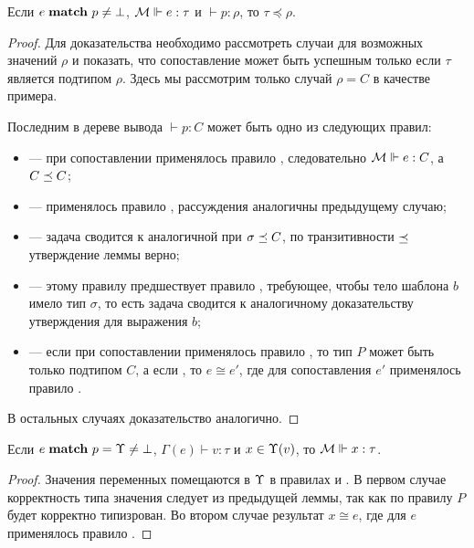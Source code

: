 \begin{Lemm}
Если $e \; \mathbf{match}_{} \; p \neq \bot$, $\mathcal{M} \Vdash e : \tau$ и $\vdash p : \rho$, то $\tau \preceq \rho$.
\end{Lemm}
\begin{proof}
Для доказательства необходимо рассмотреть случаи для возможных значений $\rho$ и показать, что сопоставление может быть успешным только если $\tau$ является подтипом $\rho$. Здесь мы рассмотрим только случай $\rho = C$ в качестве примера.

Последним в дереве вывода $\vdash p : C$ может быть одно из следующих правил:

\hspace{1cm}\parbox{.85\textwidth}{
\begin{itemize}
\item[\rref{ds-type(C)}] --- при сопоставлении применялось правило , следовательно $\mathcal{M} \Vdash e : C$, а $C \preceq C$;
\item[\rref{wc}] --- применялось правило , рассуждения аналогичны предыдущему случаю;
\item[\rref{subtype}] --- задача сводится к аналогичной при $\sigma \preceq C$, по транзитивности $\preceq$ утверждение леммы верно;
\item[\rref{appl}] --- этому правилу предшествует правило , требующее, чтобы тело шаблона $b$ имело тип $\sigma$, то есть задача сводится к аналогичному доказательству утверждения для выражения $b$;
\item[\rref{var}] --- если при сопоставлении применялось правило , то тип $P$ может быть только подтипом $C$, а если , то $e \cong e'$, где для сопоставления $e'$ применялось правило .
\end{itemize}}
В остальных случаях доказательство аналогично.
\end{proof}

\begin{Lemm}
Если $e \; \mathbf{match}_{} \; p = \Upsilon \neq \bot$, $\Gamma(e) \vdash v : \tau$ и $x \in \Upsilon(v)$, то $\mathcal{M} \Vdash x : \tau$.
\end{Lemm}
\begin{proof}
Значения переменных помещаются в $\Upsilon$ в правилах  и . В первом случае корректность типа значения следует из предыдущей леммы, так как по правилу  $P$ будет корректно типизрован. Во втором случае результат $x \cong e$, где для $e$ применялось правило .
\end{proof}


